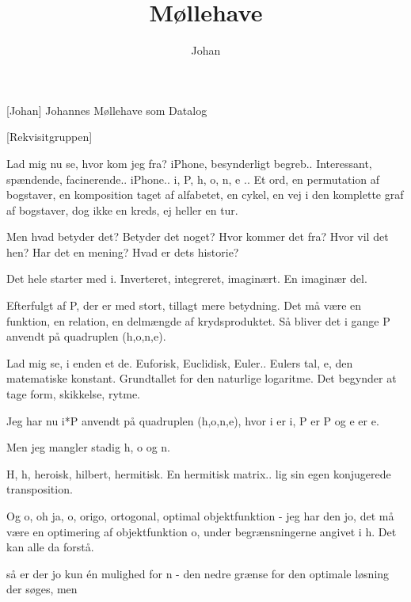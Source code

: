\documentclass[a4paper,11pt]{article}
\title{Møllehave}
\author{Johan}
\begin{document}
\maketitle

\begin{roles}
[Johan] Johannes Møllehave som Datalog
\end{roles}

\begin{props}
[Rekvisitgruppen]
\end{props}

  
\begin{sketch}

 Lad mig nu se, hvor kom jeg fra? iPhone, besynderligt
begreb.. Interessant, spændende, facinerende.. iPhone..
  i, P, h, o, n, e .. Et ord, en permutation af bogstaver, en
komposition taget af alfabetet, en cykel, en vej i den komplette graf
af bogstaver, dog ikke en kreds,
  ej heller en tur.

 Men hvad betyder det? Betyder det noget? Hvor kommer det fra?
Hvor vil det hen? Har det en mening? Hvad er dets historie?

 Det hele starter med i. Inverteret, integreret,
imaginært. En imaginær del.

 Efterfulgt af P, der er med stort, tillagt mere betydning. Det må være en
funktion, en relation, en delmængde af krydsproduktet. 
  Så bliver det i gange P anvendt på quadruplen (h,o,n,e).

 Lad mig se, i enden et de. Euforisk,
Euclidisk, Euler.. Eulers tal, e, den matematiske konstant.
  Grundtallet for den naturlige logaritme. Det begynder at tage
form, skikkelse, rytme.

 Jeg har nu i*P anvendt på quadruplen (h,o,n,e), hvor i er i, P er P og e er e.

 Men jeg mangler stadig h, o og n. 

 H, h, heroisk, hilbert, hermitisk. En hermitisk matrix..
  lig sin egen konjugerede transposition.

 Og o, oh ja, o, origo, ortogonal, optimal objektfunktion -
jeg har den jo, det må være en optimering af objektfunktion o, under
begrænsningerne angivet i h. Det kan alle da forstå.

 så er der jo kun én mulighed for n - den nedre grænse
for den optimale løsning der søges, men


\end{sketch}
\end{document}
